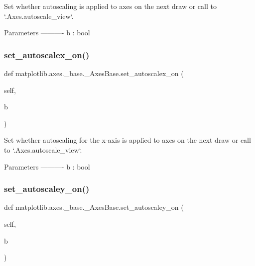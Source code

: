 \begin{DoxyVerb}Set whether autoscaling is applied to axes on the next draw or call to
`.Axes.autoscale_view`.

Parameters
----------
b : bool
\end{DoxyVerb}
 \mbox{\label{classmatplotlib_1_1axes_1_1__base_1_1__AxesBase_a9f0e955a7997aeb9a412f300e81f8cd8}} 
\subsubsection{\texorpdfstring{set\+\_\+autoscalex\+\_\+on()}{set\_autoscalex\_on()}}
{\footnotesize\ttfamily def matplotlib.\+axes.\+\_\+base.\+\_\+\+Axes\+Base.\+set\+\_\+autoscalex\+\_\+on (\begin{DoxyParamCaption}\item[{}]{self,  }\item[{}]{b }\end{DoxyParamCaption})}

\begin{DoxyVerb}Set whether autoscaling for the x-axis is applied to axes on the next
draw or call to `.Axes.autoscale_view`.

Parameters
----------
b : bool
\end{DoxyVerb}
 \mbox{\label{classmatplotlib_1_1axes_1_1__base_1_1__AxesBase_af7af12ff30af3b4a29ed35fd5308f032}} 
\subsubsection{\texorpdfstring{set\+\_\+autoscaley\+\_\+on()}{set\_autoscaley\_on()}}
{\footnotesize\ttfamily def matplotlib.\+axes.\+\_\+base.\+\_\+\+Axes\+Base.\+set\+\_\+autoscaley\+\_\+on (\begin{DoxyParamCaption}\item[{}]{self,  }\item[{}]{b }\end{DoxyParamCaption})}

